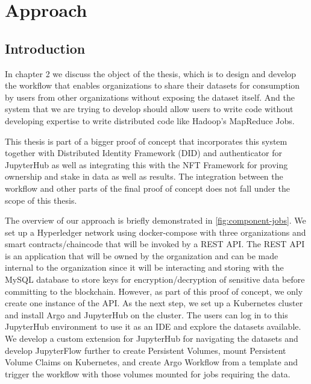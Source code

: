 
\chapter{Approach}
\label{ch:approach}

\section{Introduction}
 In chapter 2 we discuss the object of the thesis, which is to design and develop the workflow that enables organizations to share their datasets for consumption by users from other organizations without exposing the dataset itself. And the system that we are trying to develop should allow users to write code without developing expertise to write distributed code like Hadoop's MapReduce Jobs.
 
 \bigskip
 This thesis is part of a bigger proof of concept that incorporates this system together with Distributed Identity Framework (DID) and authenticator for JupyterHub as well as integrating this with the NFT Framework for proving ownership and stake in data as well as results. The integration between the workflow and other parts of the final proof of concept does not fall under the scope of this thesis.
 
 \bigskip
 The overview of our approach is briefly demonstrated in \ref{fig:component-jobs}. We set up a Hyperledger network using docker-compose with three organizations and smart contracts/chaincode that will be invoked by a REST API. The REST API is an application that will be owned by the organization and can be made internal to the organization since it will be interacting and storing with the MySQL database to store keys for encryption/decryption of sensitive data before committing to the blockchain. However, as part of this proof of concept, we only create one instance of the API. As the next step, we set up a Kubernetes cluster and install Argo and JupyterHub on the cluster. The users can log in to this JupyterHub environment to use it as an IDE and explore the datasets available. We develop a custom extension for JupyterHub for navigating the datasets and develop JupyterFlow further to create Persistent Volumes, mount Persistent Volume Claims on Kubernetes, and create Argo Workflow from a template and trigger the workflow with those volumes mounted for jobs requiring the data.

